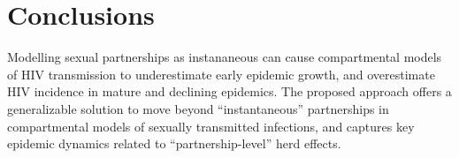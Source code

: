 \section{Conclusions}
Modelling sexual partnerships as instananeous can cause
compartmental models of HIV transmission to
underestimate early epidemic growth, and
overestimate HIV incidence in mature and declining epidemics.
The proposed approach offers a generalizable solution to move beyond ``instantaneous'' partnerships
in compartmental models of sexually transmitted infections,
and captures key epidemic dynamics related to ``partnership-level'' herd effects.

